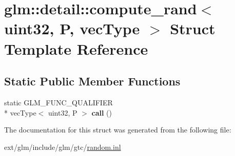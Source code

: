 \hypertarget{structglm_1_1detail_1_1compute__rand_3_01uint32_00_01_p_00_01vec_type_01_4}{\section{glm\-:\-:detail\-:\-:compute\-\_\-rand$<$ uint32, P, vec\-Type $>$ Struct Template Reference}
\label{structglm_1_1detail_1_1compute__rand_3_01uint32_00_01_p_00_01vec_type_01_4}
}
\subsection*{Static Public Member Functions}
\begin{DoxyCompactItemize}
\item 
\hypertarget{structglm_1_1detail_1_1compute__rand_3_01uint32_00_01_p_00_01vec_type_01_4_a17aa209c7dbc4ffabd9373b4b8b99f8a}{static G\-L\-M\-\_\-\-F\-U\-N\-C\-\_\-\-Q\-U\-A\-L\-I\-F\-I\-E\-R \\*
vec\-Type$<$ uint32, P $>$ {\bfseries call} ()}\label{structglm_1_1detail_1_1compute__rand_3_01uint32_00_01_p_00_01vec_type_01_4_a17aa209c7dbc4ffabd9373b4b8b99f8a}

\end{DoxyCompactItemize}


The documentation for this struct was generated from the following file\-:\begin{DoxyCompactItemize}
\item 
ext/glm/include/glm/gtc/\hyperlink{random_8inl}{random.\-inl}\end{DoxyCompactItemize}
